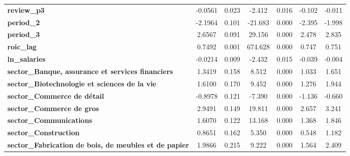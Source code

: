 \begin{center}
\begin{tabular}{lcccccc}
\textbf{review\_p3}                                                   &      -0.0561  &        0.023     &    -2.412  &         0.016        &       -0.102    &       -0.011     \\
\textbf{period\_2}                                                    &      -2.1964  &        0.101     &   -21.683  &         0.000        &       -2.395    &       -1.998     \\
\textbf{period\_3}                                                    &       2.6567  &        0.091     &    29.156  &         0.000        &        2.478    &        2.835     \\
\textbf{roic\_lag}                                                    &       0.7492  &        0.001     &   674.628  &         0.000        &        0.747    &        0.751     \\
\textbf{ln\_salaries}                                                 &      -0.0214  &        0.009     &    -2.432  &         0.015        &       -0.039    &       -0.004     \\
\textbf{sector\_Banque, assurance et services financiers}             &       1.3419  &        0.158     &     8.512  &         0.000        &        1.033    &        1.651     \\
\textbf{sector\_Biotechnologie et sciences de la vie}                 &       1.6100  &        0.170     &     9.452  &         0.000        &        1.276    &        1.944     \\
\textbf{sector\_Commerce de détail}                                   &      -0.8978  &        0.121     &    -7.390  &         0.000        &       -1.136    &       -0.660     \\
\textbf{sector\_Commerce de gros}                                     &       2.9491  &        0.149     &    19.811  &         0.000        &        2.657    &        3.241     \\
\textbf{sector\_Communications}                                       &       1.6070  &        0.122     &    13.168  &         0.000        &        1.368    &        1.846     \\
\textbf{sector\_Construction}                                         &       0.8651  &        0.162     &     5.350  &         0.000        &        0.548    &        1.182     \\
\textbf{sector\_Fabrication de bois, de meubles et de papier}         &       1.9866  &        0.215     &     9.222  &         0.000        &        1.564    &        2.409     \\

\end{tabular}
\end{center}
